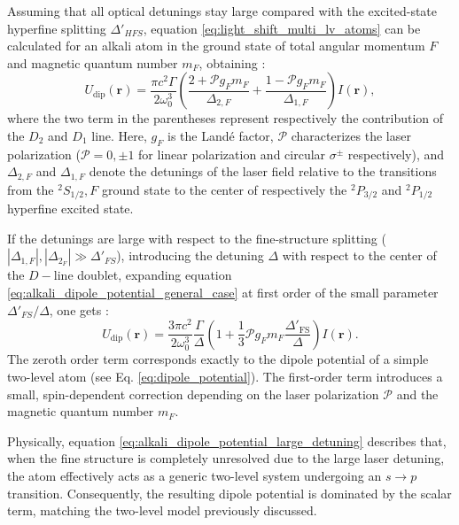 Assuming that all optical detunings stay large compared with the excited-state hyperfine splitting $\Delta'_{HFS}$, equation \eqref{eq:light_shift_multi_lv_atoms} can be calculated for an alkali atom in the ground state of total angular momentum $F$ and magnetic quantum number $m_F$, obtaining \cite{grimm}:
\begin{equation}
    \label{eq:alkali_dipole_potential_general_case}
    U_{\text{dip}}(\mathbf{r}) = \frac{\pi c^2 \Gamma}{2 \omega_0^3} \left( \frac{2 + \mathcal{P} g_F m_F}{\Delta_{2,F}} + \frac{1 - \mathcal{P} g_F m_F}{\Delta_{1,F}} \right) I(\mathbf{r}),
\end{equation}
where the two term in the parentheses represent respectively the contribution of the $D_2$ and $D_1$ line. Here, $g_F$ is the Landé factor, $\mathcal{P}$ characterizes the laser polarization ($\mathcal{P}=0,\pm1$ for linear polarization and circular $\sigma^\pm$ respectively), and $\Delta_{2,F}$ and $\Delta_{1,F}$ denote the detunings of the laser field relative to the transitions from the $^2S_{1/2}, F$ ground state to the center of respectively the $^2P_{3/2}$ and $^2P_{1/2}$ hyperfine excited state.

\vspace{0.5\baselineskip}
If the detunings are large with respect to the fine-structure splitting ($|\Delta_{1,F}|, |\Delta_{2_F}| \gg \Delta'_{FS}$), introducing the detuning $\Delta$ with respect to the center of the $D-$line doublet, expanding equation \eqref{eq:alkali_dipole_potential_general_case} at first order of the small parameter $\Delta'_{FS}/\Delta$, one gets \cite{grimm}:
\begin{equation}
    \label{eq:alkali_dipole_potential_large_detuning}
    U_{\text{dip}}(\mathbf{r}) = \frac{3 \pi c^2}{2 \omega_0^3} \frac{\Gamma}{\Delta} \left( 1 + \frac{1}{3} \mathcal{P} g_F m_F \frac{\Delta'_{\text{FS}}}{\Delta} \right) I(\mathbf{r}).
\end{equation}
The zeroth order term corresponds exactly to the dipole potential of a simple two-level atom (see Eq. \eqref{eq:dipole_potential}). The first-order term introduces a small, spin-dependent correction depending on the laser polarization $\mathcal{P}$ and the magnetic quantum number $m_F$.

Physically, equation \eqref{eq:alkali_dipole_potential_large_detuning} describes that, when the fine structure is completely unresolved due to the large laser detuning, the atom effectively acts as a generic two-level system undergoing an $s \rightarrow p$ transition.
Consequently, the resulting dipole potential is dominated by the scalar term, matching the two-level model previously discussed.

